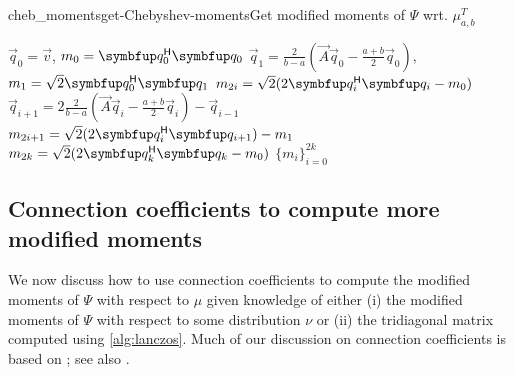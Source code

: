     \begin{labelalgorithm}[H]{cheb_moments}{get-Chebyshev-moments}{Get modified moments of \( \Psi \) wrt. \( \mu_{a,b}^T \)}
    \begin{algorithmic}[1]
        \State \( \vec{q}_0 = \vec{v} \), \( m_0 = \vec{q}_0^\cT \vec{q}_0 \)
        \State \( \vec{q}_1 = \frac{2}{b-a}(\vec{A} \vec{q}_0 - \frac{a+b}{2} \vec{q}_0) \), \( m_1 =  \sqrt{2} \vec{q}_0^\cT \vec{q}_1 \)
            \State \( m_{2i}  = \sqrt{2} (2\vec{q}_i^\cT \vec{q}_{i} - m_0) \)
            \State \( \vec{q}_{i+1} = 2 \frac{2}{b-a} (\vec{A} \vec{q}_i - \frac{a+b}{2} \vec{q}_i) - \vec{q}_{i-1} \)
            \State \( m_{2i+1}  = \sqrt{2} (2\vec{q}_i^\cT \vec{q}_{i+1}) - m_1 \)
        \EndFor
        \State \( m_{2k} = \sqrt{2}( 2 \vec{q}_k^\cT\vec{q}_k - m_0) \)
        \State \Return \( \{ m_i \}_{i=0}^{2k} \)
    \EndProcedure
    \end{algorithmic}
    \end{labelalgorithm}


    \subsection{Connection coefficients to compute more modified moments}
    \label{sec:connection_coeffs}

    We now discuss how to use connection coefficients to compute the modified moments of \( \Psi \) with respect to \( \mu \) given knowledge of either
    (i) the modified moments of \( \Psi \) with respect to some distribution \( \nu \) or 
    (ii) the tridiagonal matrix computed using \cref{alg:lanczos}.
    Much of our discussion on connection coefficients is based on \cite{webb_olver_21}; see also \cite{fischer_golub_91}.


